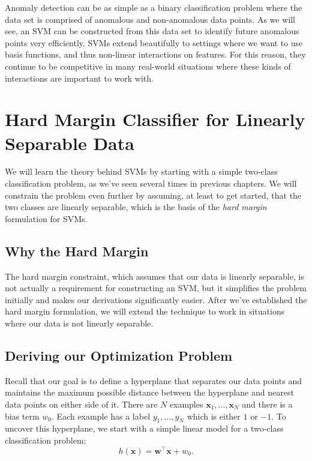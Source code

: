 Anomaly detection can be as simple as a binary classification problem where the data set is comprised of anomalous and non-anomalous data points. As we will see, an SVM can be constructed from this data set to identify future anomalous points very efficiently. SVMs extend beautifully to settings where we want to use basis functions, and thus non-linear interactions on features. For this reason, they continue to be competitive in many real-world situations where these kinds of interactions are important to work with.

\section{Hard Margin Classifier for Linearly Separable Data}

We will learn the theory behind SVMs by starting with a simple two-class classification problem, as we've seen several times in previous chapters. We will constrain the problem even further by assuming, at least to get started, that the two classes are linearly separable, which is the basis of the \textit{hard margin} formulation for SVMs.


\subsection{Why the Hard Margin}
The hard margin constraint, which assumes that our data is linearly separable, is not actually a requirement for constructing an SVM, but it simplifies the problem initially and makes our derivations significantly easier. After we've established the hard margin formulation, we will extend the technique to work in situations where our data is not linearly separable.

\subsection{Deriving our Optimization Problem}
Recall that our goal is to define a hyperplane that separates our data points and maintains the maximum possible distance between the hyperplane and nearest data points on either side of it.
There are  $N$ examples  $\textbf{x}_{1}, ..., \textbf{x}_{N}$ and there is a bias term $w_{0}$.
Each example has a label $y_{1}, ..., y_{N}$ which is either $1$ or $-1$. 
To uncover this hyperplane, we start with a simple linear model for a two-class classification problem:
\begin{equation} \label{classification-fn}
h(\textbf{x}) = \textbf{w}^\top \textbf{x} + w_{0}.
\end{equation}

